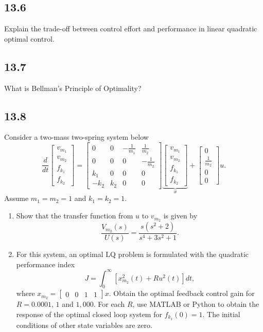 \documentclass{article}
\newcommand{\problem}[2]{\subsection*{#1}}
\begin{document}
\problem{13.6}{lq-concepts}
Explain the trade-off between control effort and performance in linear quadratic optimal control.

\problem{13.7}{lq-concepts}
What is Bellman's Principle of Optimality?

\problem{13.8}{}
Consider a two-mass two-spring system below
\[
\frac{d}{dt}\begin{bmatrix} v_{m_1} \\ v_{m_2} \\ f_{k_1} \\ f_{k_2} \end{bmatrix} =
\begin{bmatrix}
0 & 0 & -\frac{1}{m_1} & \frac{1}{m_2} \\
0 & 0 & 0 & -\frac{1}{m_2} \\
k_1 & 0 & 0 & 0 \\
-k_2 & k_2 & 0 & 0
\end{bmatrix}
\underbrace{\begin{bmatrix} v_{m_1} \\ v_{m_2} \\ f_{k_1} \\ f_{k_2} \end{bmatrix}}_{x} +
\begin{bmatrix} 0 \\ \frac{1}{m_2} \\ 0 \\ 0 \end{bmatrix} u.
\]
Assume $m_1 = m_2 = 1$ and $k_1 = k_2 = 1$.
\begin{enumerate}
\item Show that the transfer function from $u$ to $v_{m_2}$ is given by
\[
\frac{V_{m_2}(s)}{U(s)} = \frac{s\left(s^2 + 2\right)}{s^4 + 3s^2 + 1}.
\]
\item For this system, an optimal LQ problem is formulated with the quadratic performance index
\[
J = \int_0^{\infty} \left[x_{m_2}^2(t) + Ru^2(t)\right] dt,
\]
where $x_{m_2} = \begin{bmatrix} 0 & 0 & 1 & 1 \end{bmatrix} x$. Obtain the optimal feedback control gain for $R = 0.0001$, $1$ and $1{,}000$. For each $R$, use MATLAB or Python to obtain the response of the optimal closed loop system for $f_{k_1}(0) = 1$. The initial conditions of other state variables are zero.
\end{enumerate}
\end{document}
